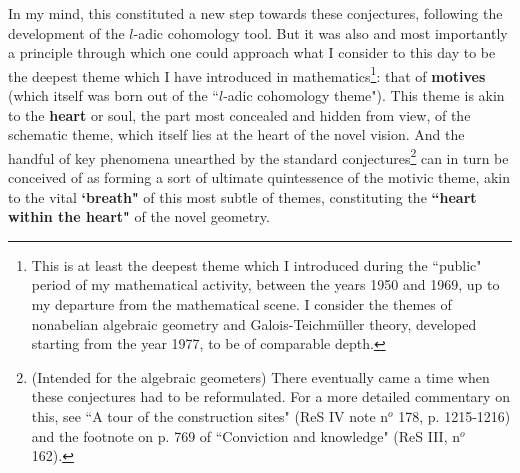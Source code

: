 In my mind, this constituted a new step towards these conjectures, following the development of the $l$-adic cohomology tool. But it was also and most importantly a principle through which one could approach what I consider to this day to be the deepest theme which I have introduced in mathematics\footnote{This is at least the deepest theme which I introduced during the ``public" period of my mathematical activity, between the years 1950 and 1969, up to my departure from the mathematical scene. I consider the themes of nonabelian algebraic geometry and Galois-Teichm\"uller theory, developed starting from the year 1977, to be of comparable depth.}: that of \textbf{motives} (which itself was born out of the ``$l$-adic cohomology theme").  This theme is akin to the \textbf{heart} or soul, the part most concealed and hidden from view, of the schematic theme, which itself lies at the heart of the novel vision. And the handful of key phenomena unearthed by the standard conjectures\footnote{(Intended for the algebraic geometers)  There eventually came a time when these conjectures had to be reformulated. For a more detailed commentary on this, see ``A tour of the construction sites" (ReS IV note n$^o$ 178, p. 1215-1216) and the footnote on p. 769 of ``Conviction and knowledge" (ReS III, n$^o$ 162).
} can in turn be conceived of as forming a sort of ultimate quintessence of the motivic theme, akin to the vital \textbf{`breath"} of this most subtle of themes, constituting the \textbf{``heart within the heart"} of the novel geometry.

